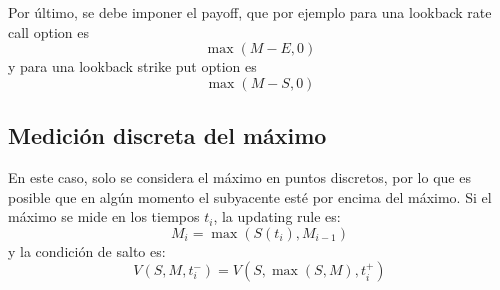 Por último, se debe imponer el payoff, que por ejemplo para una lookback rate call option es
\begin{equation*}
    \max(M-E, 0)
\end{equation*}
y para una lookback strike put option es
\begin{equation*}
    \max(M-S, 0)
\end{equation*}



\subsection{Medición discreta del máximo}
En este caso, solo se considera el máximo en puntos discretos, por lo que es posible que en algún momento el subyacente esté por encima del máximo. Si el máximo se mide en los tiempos $t_i$, la updating rule es:
\begin{equation*}
    \boxed{M_i = \max(S(t_i), M_{i-1})}
\end{equation*}
y la condición de salto es:
\begin{equation*}
    \boxed{V(S, M, t_i^-) = V(S, \max(S, M), t_i^+)}
\end{equation*}







